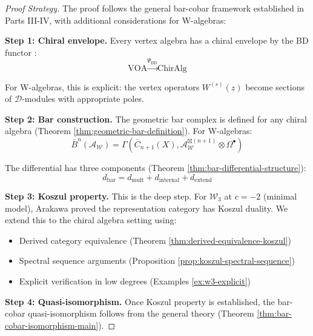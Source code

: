 \begin{proof}[Proof Strategy]
The proof follows the general bar-cobar framework established in Parts III-IV, 
with additional considerations for W-algebras:

\textbf{Step 1: Chiral envelope.} Every vertex algebra has a chiral envelope by 
the BD functor :
$$\text{VOA} \xrightarrow{\Psi_{\text{BD}}} \text{ChirAlg}$$

For W-algebras, this is explicit: the vertex operators $W^{(s)}(z)$ become sections 
of $\mathcal{D}$-modules with appropriate poles.

\textbf{Step 2: Bar construction.} The geometric bar complex is defined for any 
chiral algebra (Theorem \ref{thm:geometric-bar-definition}). For W-algebras:
$$\bar{B}^n(\mathcal{A}_{\mathcal{W}}) = \Gamma\left(\overline{C}_{n+1}(X), 
\mathcal{A}_{\mathcal{W}}^{\boxtimes(n+1)} \otimes \Omega^\bullet\right)$$

The differential has three components (Theorem \ref{thm:bar-differential-structure}):
$$d_{\text{bar}} = d_{\text{mult}} + d_{\text{internal}} + d_{\text{extend}}$$

\textbf{Step 3: Koszul property.} This is the deep step. For $\mathcal{W}_3$ at 
$c = -2$ (minimal model), Arakawa \cite{Ara07} proved the representation category 
has Koszul duality. We extend this to the chiral algebra setting using:
\begin{itemize}
\item Derived category equivalence (Theorem \ref{thm:derived-equivalence-koszul})
\item Spectral sequence arguments (Proposition \ref{prop:koszul-spectral-sequence})
\item Explicit verification in low degrees (Examples \ref{ex:w3-explicit})
\end{itemize}

\textbf{Step 4: Quasi-isomorphism.} Once Koszul property is established, the 
bar-cobar quasi-isomorphism follows from the general theory (Theorem 
\ref{thm:bar-cobar-isomorphism-main}).
\end{proof}

